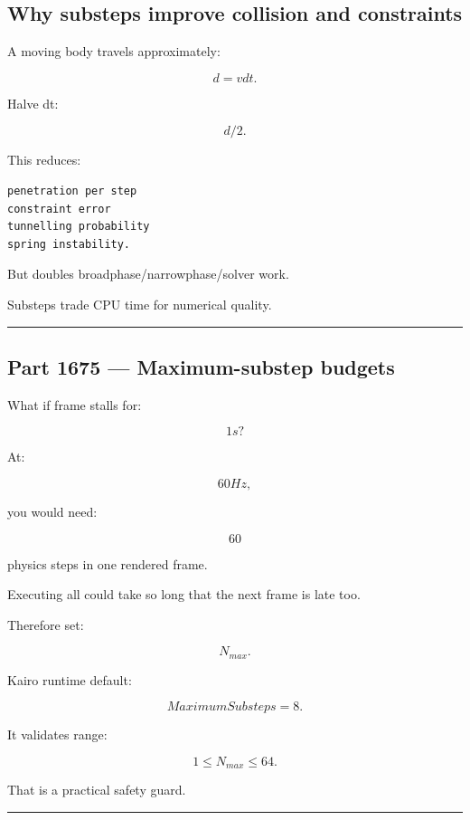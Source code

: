 \subsection{Why substeps improve collision and constraints}\label{06-engine-ii-ch037-why-substeps-improve-collision-and-constraints}

A moving body travels approximately:

\[
d=vdt.
\]

Halve dt:

\[
d/2.
\]

This reduces:

\begin{verbatim}
penetration per step
constraint error
tunnelling probability
spring instability.
\end{verbatim}

But doubles broadphase/narrowphase/solver work.

Substeps trade CPU time for numerical quality.

\begin{center}\rule{0.5\linewidth}{0.5pt}\end{center}

\subsection{Part 1675 --- Maximum-substep budgets}\label{06-engine-ii-ch037-part-1675-maximum-substep-budgets}

What if frame stalls for:

\[
1s?
\]

At:

\[
60Hz,
\]

you would need:

\[
60
\]

physics steps in one rendered frame.

Executing all could take so long that the next frame is late too.

Therefore set:

\[
N_{max}.
\]

Kairo runtime default:

\[
\boxed{
MaximumSubsteps=8.
}
\]

It validates range:

\[
1\le N_{max}\le64.
\]

That is a practical safety guard.

\begin{center}\rule{0.5\linewidth}{0.5pt}\end{center}

